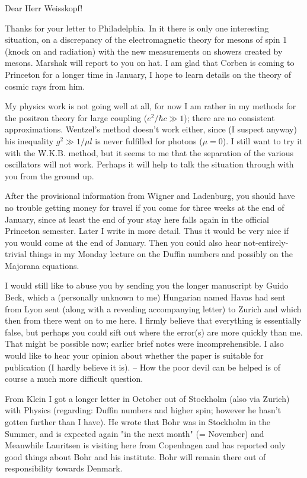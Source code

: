 \date{December 30, 1940}

Dear Herr Weisskopf!

Thanks for your letter to Philadelphia. In it there is only one interesting situation, on a discrepancy of the electromagnetic theory for mesons of spin 1 (knock on and radiation) with the new measurements on showers created by mesons. Marshak will report to you on 
hat. I am glad that Corben is coming to Princeton for a longer time in January, I hope to learn details on the theory of cosmic rays from him.

My physics work is not going well at all, for now I am rather  in my methods for the positron theory for large coupling ($e^2/\hbar c \gg 1$); there are no consistent approximations. Wentzel's method doesn't work either, since (I suspect anyway) his inequality $g^2 \gg 1/\mu l$ is never fulfilled for photons ($\mu=0$). I still want to try it with the W.K.B. method, but it seems to me that the separation of the various oscillators will not work. Perhaps it will help to talk the situation through with you from the ground up.

After the provisional information from Wigner and Ladenburg, you should have no trouble getting money for travel if you come for three weeks at the end of January, since at least the end of your stay here falls again in the official Princeton semester. Later I write in more detail. Thus it would be very nice if you would come at the end of January. Then you could also hear not-entirely-trivial things in my Monday lecture on the Duffin numbers and possibly on the Majorana equations.

I would still like to abuse you by sending you the longer manuscript by Guido Beck, which a (personally unknown to me) Hungarian named Havas had sent from Lyon sent (along with a revealing accompanying letter) to Zurich and which then from there went on to me here. I firmly believe that everything is essentially false, but perhaps you could sift out where the error(s) are more quickly than me. That might be possible now; earlier brief notes were incomprehensible. I also would like to hear your opinion about whether the paper is suitable for publication (I hardly believe it is). -- How the poor devil can be helped is of course a much more difficult question.

From Klein I got a longer letter in October out of Stockholm (also via Zurich) with Physics (regarding: Duffin numbers and higher spin; however he hasn't gotten further than I have). He wrote that Bohr was in Stockholm in the Summer, and is expected again "in the next month" (= November) and  Meanwhile Lauritsen is visiting here from Copenhagen and has reported only good things about Bohr and his institute. Bohr will remain there out of responsibility towards Denmark.

